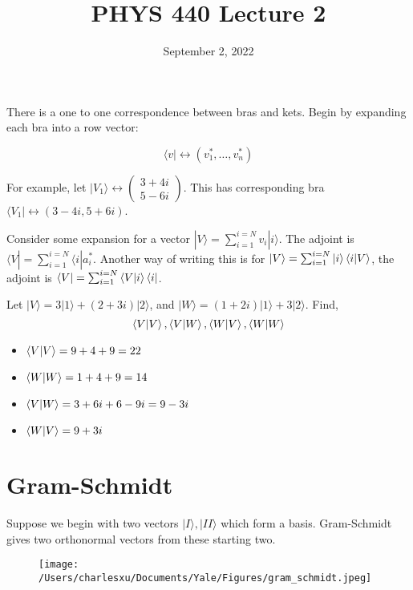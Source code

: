\documentclass[11pt]{scrartcl}
\begin{document}
\title{PHYS 440 Lecture 2}
\date{September 2, 2022}
\maketitle

There is a one to one correspondence between bras and kets. Begin by expanding each bra into a row vector:

\begin{equation}
	\langle v | \leftrightarrow ( v_1^*, \ldots, v_n^* ) 
\end{equation}

For example, let $ |V_1 \rangle  \leftrightarrow \begin{pmatrix}
3 + 4i \\ 5 - 6i
\end{pmatrix} $. This has corresponding bra $ \langle V_1 | \leftrightarrow (3-4i, 5 + 6i) $.

Consider some expansion for a vector $ |V \rangle = \sum_{i = 1}^{ i = N} v_i |i \rangle  $. The adjoint is $ \langle V | = \sum_{i = 1}^{ i = N} \langle i | a_i^* $. Another way of writing this is for $ |V \rangle  = \sum_{i = 1}^{ i = N} |i \rangle \braket{i|V}  $, the adjoint is $ \langle V | = \sum_{i = 1}^{ i = N} \braket{V|i} \langle i |   $.

\begin{example}
	Let $ |V \rangle = 3 |1 \rangle + (2 + 3i) | 2 \rangle  $, and $ |W \rangle  = (1 + 2i) |1  \rangle + 3 |2 \rangle  $. Find, $$ \braket{V|V} , \braket{V|W} , \braket{W|V} , \braket{W|W}  $$
\end{example}
\begin{itemize}
	\item $ \braket{V|V}  = 9 + 4 + 9 = 22 $
	\item $ \braket{W|W} = 1 + 4 + 9 = 14 $
	\item $ \braket{V|W}  = 3 + 6i + 6 - 9i = 9 - 3i $ 
	\item $ \braket{W|V}  = 9 + 3i $
\end{itemize}

\section{Gram-Schmidt}

Suppose we begin with two vectors $ |I \rangle , |II \rangle  $ which form a basis. Gram-Schmidt gives two orthonormal vectors from these starting two.

\begin{figure}[h]
\begin{center}
\texttt{[image: /Users/charlesxu/Documents/Yale/Figures/gram\_schmidt.jpeg]}
\end{center}
\caption{}
\label{fig:gram_schmidt}
\end{figure}
\end{document}
